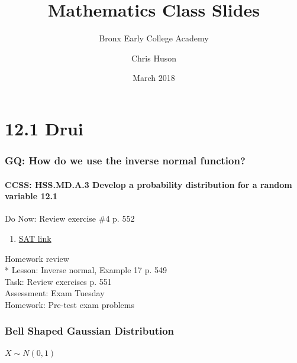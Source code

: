 \documentclass{beamer}
\title{Mathematics Class Slides}
\subtitle{Bronx Early College Academy}
\author{Chris Huson}
\date{March 2018}
\begin{document}
\frame{\titlepage}


\section{12.1 Drui}
\frame
{
  \frametitle{GQ: How do we use the inverse normal function?}
  \framesubtitle{CCSS: HSS.MD.A.3 Develop a probability distribution for a random variable \qquad \alert{12.1}}

  \begin{block}{Do Now: Review exercise \#4 p. 552}
    \begin{enumerate}
    \item \href{https://blog.prepscholar.com/sat-standard-deviation}{SAT link}
    \end{enumerate}
 \end{block}
  Homework review\\*
  Lesson: Inverse normal, Example 17 p. 549\\%
  Task: Review exercises p. 551\\%
  Assessment: Exam Tuesday\\%
  Homework: Pre-test exam problems
}

\frame
{
  \frametitle{Bell Shaped Gaussian Distribution}
    \framesubtitle{$X \sim N(0, 1)$}
\begin{figure}
\begin{center}
\end{center}
\end{figure}

}
\end{document}
